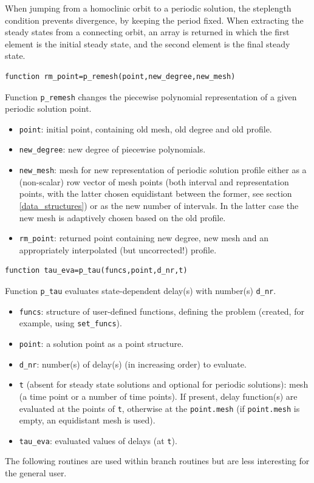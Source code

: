 \documentclass[10pt]{scrartcl}
\newcommand{\blist}[1]{\mbox{\lstinline!#1!}}
\begin{document}
{When jumping from a homoclinic orbit to a periodic solution, the
steplength condition prevents divergence, by keeping the period fixed.
When extracting the steady states from a connecting orbit, an array is
returned in which the first element is the initial steady state, and
the second element is the final steady state.

\begin{lstlisting}
function rm_point=p_remesh(point,new_degree,new_mesh)  
\end{lstlisting}
\noindent Function \blist{p_remesh} changes the piecewise polynomial
representation of a given periodic solution point.
\begin{itemize}
\item \blist{point}: initial point, containing old mesh, old degree
  and old profile.
\item \blist{new_degree}: new degree of piecewise polynomials.
\item \blist{new_mesh}: mesh for new representation of periodic
  solution profile either as a (non-scalar) row vector of mesh points
  (both interval and representation points, with the latter chosen
  equidistant between the former, see section \ref{data_structures})
  or as the new number of intervals.  In the latter case the new mesh
  is adaptively chosen based on the old profile.
\item \blist{rm_point}: returned point containing new degree, new mesh
  and an appropriately interpolated (but uncorrected!) profile.
\end{itemize} 
\begin{lstlisting}
function tau_eva=p_tau(funcs,point,d_nr,t)  
\end{lstlisting}
\noindent Function \blist{p_tau} evaluates state-dependent delay(s) 
with number(s) \blist{d_nr}. 
\begin{itemize}
\item \blist{funcs}: structure of user-defined functions, defining the
  problem (created, for example, using \blist{set_funcs}).
\item \blist{point}: a solution point as a point structure.
\item \blist{d_nr}: number(s) of delay(s) (in increasing order) 
to evaluate.
\item \blist{t} (absent for steady state solutions and optional for
  periodic solutions): mesh (a time point or a number of time
  points). If present, delay function(s) are evaluated at the points
  of \blist{t}, otherwise at the \blist{point.mesh} (if
  \blist{point.mesh} is empty, an equidistant mesh is used).
\item \blist{tau_eva}: evaluated values of delays (at \blist{t}). 
\end{itemize}
The following routines are used within branch routines but
are less interesting for the general user.

}
\end{document}
